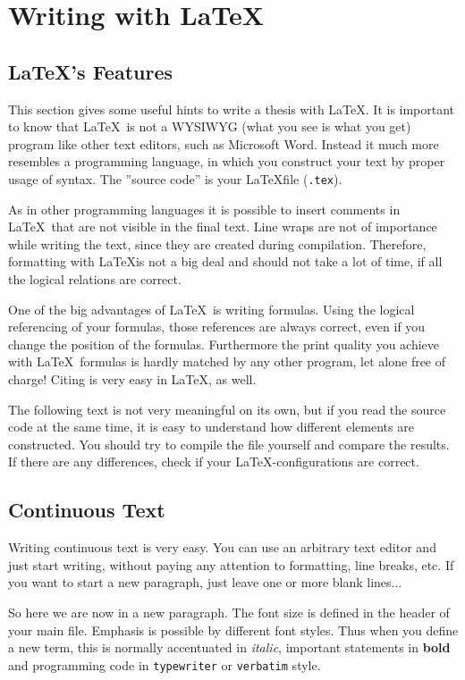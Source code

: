 \section{Writing with \LaTeX}\label{a:latex_en}

\subsection{\LaTeX's Features}

This section gives some useful hints to write a thesis with \LaTeX. It is important to know that \LaTeX\ is not a WYSIWYG (what you see is what you get) program like other text editors, such as Microsoft Word.
Instead it much more resembles a programming language, in which you construct your text by proper usage of syntax. The ''source code'' is your \LaTeX file (\texttt{.tex}). 

As in other programming languages it is possible to insert comments in \LaTeX\ that are not visible in the final text. 
Line wraps are not of importance while writing the text, since they are created during compilation. Therefore, formatting 
with \LaTeX is not a big deal and should not take a lot of time, if all the logical relations are correct.

One of the big advantages of \LaTeX\ is writing formulas. Using the logical referencing of your formulas, those references are 
always correct, even if you change the position of the formulas. Furthermore the print quality you achieve with \LaTeX\ formulas 
is hardly matched by any other program, let alone free of charge!
Citing is very easy in \LaTeX, as well.


The following text is not very meaningful on its own, but if you read the source code at the same time, it is easy to understand how 
different elements are constructed. You should try to compile the file yourself and compare the results. If there are any differences,
check if your \LaTeX-configurations are correct.


\subsection{Continuous Text}

Writing continuous text is very easy. You can use an arbitrary text editor and just start writing, without paying any attention to 
formatting, line breaks, etc. If you want to start a new paragraph, just leave one or more blank lines...

So here we are now in a new paragraph. The font size is defined in the header of your main file. Emphasis is possible by different font styles. 
Thus when you define a new term, this is normally accentuated in \textit{italic}, important statements in \textbf{bold} and programming code in
\texttt{typewriter} or \verb"verbatim" style.

